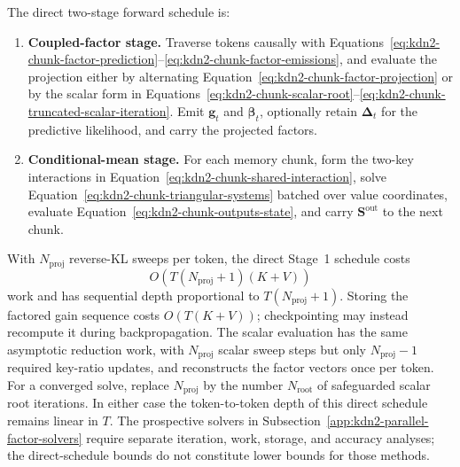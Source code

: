 \documentclass[11pt]{article}
\newcommand{\ve}[1]{\boldsymbol{#1}}
\begin{document}
The direct two-stage forward schedule is:
\begin{enumerate}
  \item \textbf{Coupled-factor stage.} Traverse tokens causally with
    Equations~\eqref{eq:kdn2-chunk-factor-prediction}--\eqref{eq:kdn2-chunk-factor-emissions},
    and evaluate the projection either by alternating
    Equation~\eqref{eq:kdn2-chunk-factor-projection} or by the scalar form in
    Equations~\eqref{eq:kdn2-chunk-scalar-root}--\eqref{eq:kdn2-chunk-truncated-scalar-iteration}.
    Emit $\ve{g}_t$ and $\ve{\beta}_t$, optionally retain $\ve{\Delta}_t$ for the predictive
    likelihood, and carry the projected factors.
  \item \textbf{Conditional-mean stage.} For each memory chunk, form the two-key interactions in
    Equation~\eqref{eq:kdn2-chunk-shared-interaction}, solve
    Equation~\eqref{eq:kdn2-chunk-triangular-systems} batched over value coordinates, evaluate
    Equation~\eqref{eq:kdn2-chunk-outputs-state}, and carry $\ve{S}^{\mathrm{out}}$ to the next
    chunk.
\end{enumerate}

With $N_{\mathrm{proj}}$ reverse-KL sweeps per token, the direct Stage~1 schedule costs
\begin{equation}
  O\!\left(T(N_{\mathrm{proj}}+1)(K+V)\right)
  \label{eq:kdn2-chunk-factor-cost}
\end{equation}
work and has sequential depth proportional to $T(N_{\mathrm{proj}}+1)$.  Storing the factored gain
sequence costs $O(T(K+V))$; checkpointing may instead recompute it during backpropagation.
The scalar evaluation has the same asymptotic reduction work, with $N_{\mathrm{proj}}$ scalar
sweep steps but only $N_{\mathrm{proj}}-1$ required key-ratio updates, and reconstructs the factor
vectors once per token.  For a converged solve, replace $N_{\mathrm{proj}}$ by the number
$N_{\mathrm{root}}$ of safeguarded scalar root iterations.  In either case the token-to-token
depth of this direct schedule remains linear in $T$.  The prospective solvers in
Subsection~\ref{app:kdn2-parallel-factor-solvers} require separate iteration, work, storage, and
accuracy analyses; the direct-schedule bounds do not constitute lower bounds for those methods.
\end{document}
